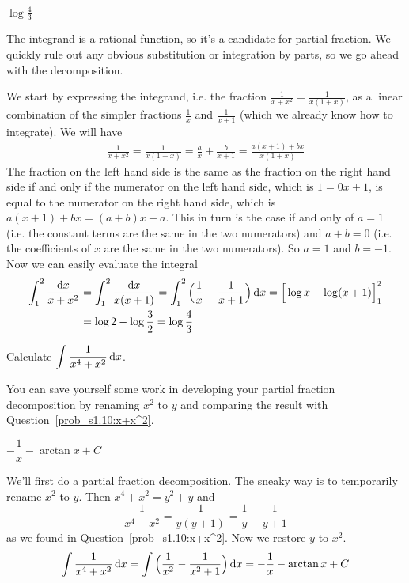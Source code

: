 \begin{answer}
$\displaystyle\log\frac{4}{3}$
\end{answer}

\begin{solution}
The integrand is a rational function, so it's a candidate for partial fraction. We quickly rule out any obvious substitution or integration by parts, so we go ahead with the decomposition.


We start by expressing the integrand,
i.e. the fraction $\frac{1}{x+x^2}=\frac{1}{x(1+x)}$, as a linear
combination of the simpler fractions  $\frac{1}{x}$ and $\frac{1}{x+1}$
(which we already know how to integrate). We will have
\begin{align*}
\frac{1}{x+x^2}=\frac{1}{x(1+x)} = \frac{a}{x} + \frac{b}{x+1}
=\frac{a(x+1) +bx}{x(1+x)}
\end{align*}
The fraction on the left hand side is the same as the fraction
on the right hand side if and only if the numerator on the left
hand side, which is $1 = 0x + 1$, is equal to the numerator on the
right hand side, which is $a(x+1)+bx = (a+b)x +a$. This in turn
is the case if and only of $a=1$ (i.e. the constant terms are
the same in the two numerators) and $a+b=0$ (i.e. the coefficients
of $x$ are the same in the two numerators). So $a=1$ and $b=-1$.
Now we can easily evaluate the integral
\begin{align*}
\int_1^2 \frac{\mathrm{d}x}{x+x^2}
&=\int_1^2 \frac{\mathrm{d}x}{x(x+1)}
=\int_1^2 \Big(\frac{1}{x}-\frac{1}{x+1}\Big)\,\mathrm{d}x
=\Big[\log x-\log(x+1)\Big]_1^2\\
&=\log 2-\log\frac{3}{2}
=\log\frac{4}{3}
\end{align*}
\end{solution}

\begin{question}[2015A]
Calculate $\displaystyle \int \frac{1}{x^4+x^2}\,\mathrm{d}x$.
\end{question}

\begin{hint}
You can save yourself some work in developing your partial fraction decomposition
by renaming $x^2$ to $y$ and comparing the result with Question~\ref{prob_s1.10:x+x^2}.
\end{hint}

\begin{answer}
$-\dfrac{1}{x}-\arctan x+C$
\end{answer}

\begin{solution}
We'll first do a partial fraction decomposition. The sneaky
way is to temporarily rename $x^2$ to $y$. Then $x^4+x^2=y^2+y$
and
\begin{equation*}
\frac{1}{x^4+x^2} = \frac{1}{y(y+1)}
  =\frac{1}{y}-\frac{1}{y+1}
\end{equation*}
  as we found in Question~\ref{prob_s1.10:x+x^2}.
Now we restore $y$ to $x^2$.
\begin{align*}
\int \frac1{x^4+x^2}\,\mathrm{d}x
=\int \Big(\frac{1}{x^2}-\frac{1}{x^2+1}\Big)\,\mathrm{d}x
=-\frac{1}{x}-\arctan x+C
\end{align*}

\end{solution}

